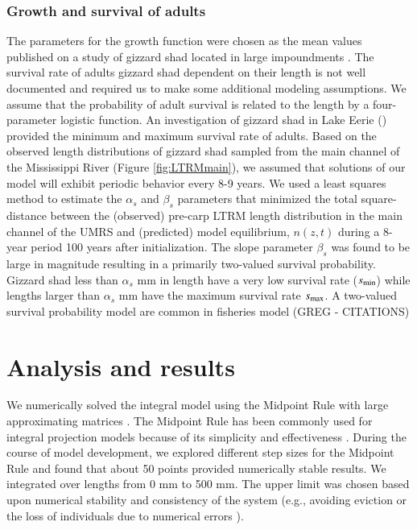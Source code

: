 \documentclass[preprint,review,12pt,authoryear]{elsarticle}
\def\ds{\displaystyle}
\begin{document}
\subsubsection{Growth and survival of adults}
The parameters for the growth function were chosen as the mean values published on a study of gizzard shad located in large impoundments \citep{michaletz2017variation}. 
The survival rate of adults gizzard shad dependent on their length is not well documented and required us to make some additional modeling assumptions.  
We assume that the probability of adult survival is related to the length by a four-parameter logistic function.
An investigation of gizzard shad in Lake Eerie (\cite{bodola1955life}) provided the minimum and maximum survival rate of adults. 
Based on the observed length distributions of gizzard shad sampled from the main channel of the Mississippi River (Figure \ref{fig:LTRMmain}), we assumed that solutions of our model will exhibit periodic behavior every 8-9 years.   
We used a least squares method to estimate the $\alpha_s$ and $\beta_s$ parameters that 
minimized the total square-distance between the (observed) pre-carp LTRM length distribution in the main channel of the UMRS and (predicted) model equilibrium, $n(z,t)$ during a 8-year period 100 years after initialization.  
The slope parameter $\beta_s$ was found to be large in magnitude resulting in a primarily two-valued survival probability.  
Gizzard shad less than $\alpha_s$ mm in length have a very low survival rate ($\ds s_{\rm {min}}$) while lengths larger than  $\alpha_s$ mm have the maximum survival rate $\ds s_{\rm {max}}$. 
A two-valued survival probability model are common in fisheries model (GREG - CITATIONS)

\section{Analysis and results}
We numerically solved the integral model using the Midpoint Rule with large approximating matrices \citep{burden2005numerical}. 
The Midpoint Rule has been commonly used for integral projection models because of its simplicity and effectiveness \citep{ellner2006integral, ramula2009integral,  merow2014advancing}. 
During the course of model development, we explored different step sizes for the Midpoint Rule and found that about 50 points provided numerically stable results. 
We integrated over lengths from 0 mm to 500 mm. 
The upper limit was chosen based upon numerical stability and consistency of the system (e.g., avoiding eviction or the loss of individuals due to numerical errors \citep{williams2012avoiding}). 
\end{document}
